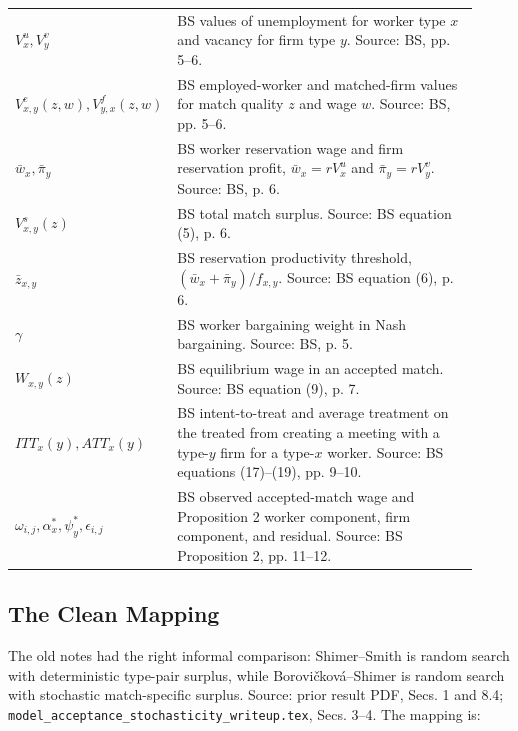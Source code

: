 ﻿\documentclass[11pt]{article}
\newcommand{\1}{\mathbf{1}}
\begin{document}
\begin{longtable}{>{\raggedright\arraybackslash}p{0.24\linewidth}
                >{\raggedright\arraybackslash}p{0.68\linewidth}}
$V_x^u,V_y^v$ & BS values of unemployment for worker type $x$ and vacancy for firm type $y$. Source: BS, pp. 5--6. \\
$V^e_{x,y}(z,w),V^f_{y,x}(z,w)$ & BS employed-worker and matched-firm values for match quality $z$ and wage $w$. Source: BS, pp. 5--6. \\
$\bar w_x,\bar\pi_y$ & BS worker reservation wage and firm reservation profit, $\bar w_x=rV_x^u$ and $\bar\pi_y=rV_y^v$. Source: BS, p. 6. \\
$V^s_{x,y}(z)$ & BS total match surplus. Source: BS equation (5), p. 6. \\
$\bar z_{x,y}$ & BS reservation productivity threshold, $(\bar w_x+\bar\pi_y)/f_{x,y}$. Source: BS equation (6), p. 6. \\
$\gamma$ & BS worker bargaining weight in Nash bargaining. Source: BS, p. 5. \\
$W_{x,y}(z)$ & BS equilibrium wage in an accepted match. Source: BS equation (9), p. 7. \\
$ITT_x(y),ATT_x(y)$ & BS intent-to-treat and average treatment on the treated from creating a meeting with a type-$y$ firm for a type-$x$ worker. Source: BS equations (17)--(19), pp. 9--10. \\
$\omega_{i,j},\alpha_x^*,\psi_y^*,\epsilon_{i,j}$ & BS observed accepted-match wage and Proposition 2 worker component, firm component, and residual. Source: BS Proposition 2, pp. 11--12. \\
\bottomrule
\end{longtable}

\subsection{The Clean Mapping}

The old notes had the right informal comparison: Shimer--Smith is random search
with deterministic type-pair surplus, while Borovi\v{c}kov\'a--Shimer is random
search with stochastic match-specific surplus. Source: prior result PDF, Secs.
1 and 8.4; \texttt{model\_acceptance\_stochasticity\_writeup.tex}, Secs. 3--4.
The mapping is:
\end{document}
